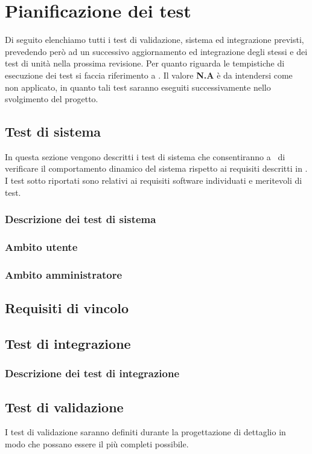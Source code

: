 \section{Pianificazione dei test}
Di seguito elenchiamo tutti i test di validazione, sistema ed integrazione previsti, prevedendo però ad un successivo aggiornamento ed integrazione degli stessi e dei test di unità nella prossima revisione. Per quanto riguarda le tempistiche di esecuzione dei test si faccia riferimento a \infoPDP.
Il valore \textbf{N.A} è da intendersi come non applicato, in quanto tali test saranno eseguiti successivamente nello svolgimento del progetto.
\subsection{Test di sistema}
In questa sezione vengono descritti i test di sistema che consentiranno a \gruppo ~di verificare il comportamento dinamico del sistema rispetto ai requisiti descritti in \infoAR. I test sotto riportati sono relativi ai requisiti software individuati e meritevoli di test.
\subsubsection{Descrizione dei test di sistema}
\subsubsection{Ambito utente}
\subsubsection{Ambito amministratore}
\subsection{Requisiti di vincolo}
\subsection{Test di integrazione}
\subsubsection{Descrizione dei test di integrazione}

\subsection{Test di validazione}
I test di validazione saranno definiti durante la progettazione di dettaglio in modo che possano essere il più completi possibile.

